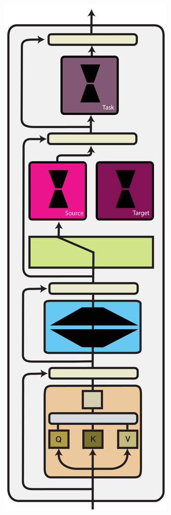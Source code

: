 \documentclass[10pt]{article} %
\begin{document}
\begin{figure}[t]
    \centering
    \begin{subfigure}[b]{.15\linewidth}
    \centering
        \includegraphics[width=.99\linewidth]{img/madx.pdf}

\end{subfigure}
\end{figure}
\end{document}
